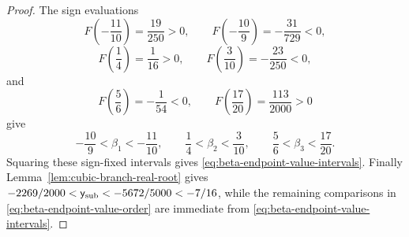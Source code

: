 \begin{proof}
The sign evaluations
\[
F\!\left(-\frac{11}{10}\right)=\frac{19}{250}>0,
\qquad
F\!\left(-\frac{10}{9}\right)=-\frac{31}{729}<0,
\]
\[
F\!\left(\frac14\right)=\frac1{16}>0,
\qquad
F\!\left(\frac3{10}\right)=-\frac{23}{250}<0,
\]
and
\[
F\!\left(\frac56\right)=-\frac1{54}<0,
\qquad
F\!\left(\frac{17}{20}\right)=\frac{113}{2000}>0
\]
give
\[
-\frac{10}{9}<\beta_1<-\frac{11}{10},
\qquad
\frac14<\beta_2<\frac3{10},
\qquad
\frac56<\beta_3<\frac{17}{20}.
\]
Squaring these sign-fixed intervals gives \eqref{eq:beta-endpoint-value-intervals}.  Finally Lemma~\ref{lem:cubic-branch-real-root} gives
\(-2269/2000<\mathsf{y}_{\mathrm{sub}}<-5672/5000<-7/16\), while the remaining comparisons in \eqref{eq:beta-endpoint-value-order} are immediate from \eqref{eq:beta-endpoint-value-intervals}.
\end{proof}

